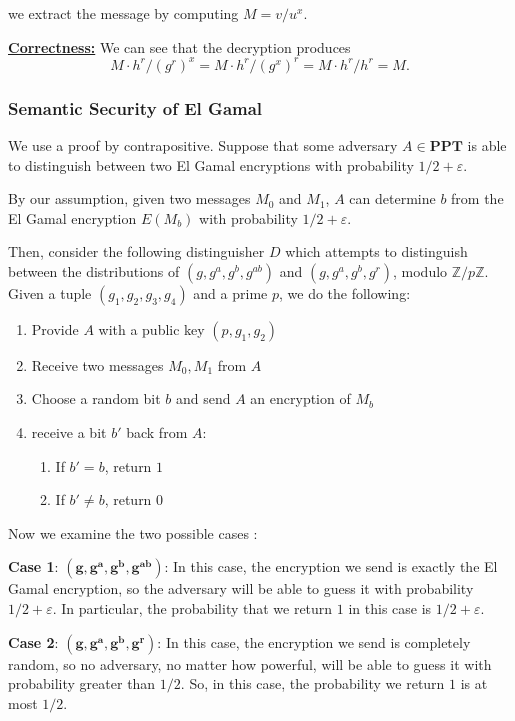 \documentclass[11pt]{article}
\newcommand{\PPT}{\mathbf{PPT}}
\newcommand{\Z}{\mathbb{Z}}
\newcommand{\tb}{\textbf}
\newcommand{\mb}{\mathbf}
\begin{document}
we extract the message by computing \(M = v/u^x\).\bigskip


\textbf{\underline{Correctness:}} We can see that the decryption produces 
\[M\cdot h^r/(g^r)^x = M\cdot h^r/(g^x)^r = M\cdot h^r/h^r = M.\]

\subsubsection{Semantic Security of El Gamal}

We use a proof by contrapositive. Suppose that some adversary \(A\in\PPT\) is able to distinguish between two El Gamal encryptions with probability \(1/2+\varepsilon\).\bigskip

By our assumption, given two messages \(M_0\) and \(M_1\), \(A\) can determine \(b\) from the El Gamal encryption \(E(M_b)\) with probability \(1/2+\varepsilon\).

Then, consider the following distinguisher \(D\) which attempts to distinguish between the distributions of \((g,g^a,g^b,g^{ab})\) and \((g,g^a,g^b,g^r)\), modulo \(\Z/p\Z\).
Given a tuple \((g_1,g_2,g_3,g_4)\) and a prime \(p\), we do the following:

\begin{enumerate}
\item Provide \(A\) with a public key \((p,g_1,g_2)\)
\item Receive two messages \(M_0, M_1\) from \(A\)
\item Choose a random bit \(b\) and send \(A\) an encryption of \(M_b\)
\item receive a bit \(b'\) back from \(A\):
\begin{enumerate}
\item If \(b'=b\), return \(1\)
\item If \(b'\ne b\), return \(0\)
\end{enumerate}
\end{enumerate}

Now we examine the two possible cases :\smallskip

\tb{Case 1}: \(\mb{(g,g^a,g^b,g^{ab})}\): 
In this case, the encryption we send is exactly the El Gamal encryption, so the adversary will be able to guess it with probability \(1/2+\varepsilon\).
In particular, the probability that we return \(1\) in this case is \(1/2+\varepsilon\).\smallskip

\tb{Case 2}: \(\mb{(g,g^a,g^b,g^r)}\):
In this case, the encryption we send is completely random, so no adversary, no matter how powerful, will be able to guess it with probability greater than \(1/2\).
So, in this case, the probability we return \(1\) is at most \(1/2\).\medskip
\end{document}
